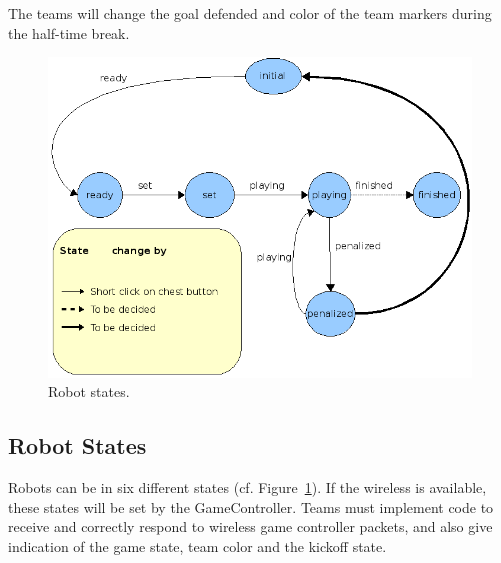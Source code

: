 \documentclass[12pt]{article}
\newcommand{\cf}{\mbox{cf.}\xspace}
\begin{document}
The teams will change the goal defended and color of the team
markers during the half-time break.

\begin{figure}[t]
\centerline{\includegraphics[width=0.9\columnwidth]{figs/states.png}}
\caption{Robot states.}
\label{fig:robot_states}
\end{figure}

\subsection{Robot States}
\label{sec:robot_states}

Robots can be in six different states (\cf
Figure~\ref{fig:robot_states}). If the wireless is available, these
states will be set by the GameController.  Teams must implement code to receive and correctly respond to wireless game controller packets, and also give indication of the game state, team color and the kickoff state.

\end{document}
